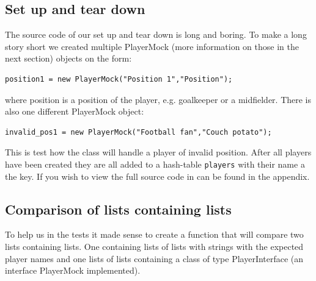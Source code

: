 \documentclass{article}
\begin{document}
\subsection{Set up and tear down}
The source code of our set up and tear down is long and boring. To make a long story short we created multiple PlayerMock (more information on those in the next section) objects on the form:
\begin{verbatim}
position1 = new PlayerMock("Position 1","Position");
\end{verbatim}
where position is a position of the player, e.g. goalkeeper or a midfielder. There is also one different PlayerMock object:
\begin{verbatim}
invalid_pos1 = new PlayerMock("Football fan","Couch potato");
\end{verbatim}
This is test how the class will handle a player of invalid position. After all players have been created they are all added to a hash-table \texttt{players} with their name a the key. If you wish to view the full source code in can be found in the appendix.

\subsection{Comparison of lists containing lists}
To help us in the tests it made sense to create a function that will compare two lists containing lists. One containing lists of lists with strings with the expected player names and one lists of lists containing a class of type PlayerInterface (an interface PlayerMock implemented).
\end{document}
